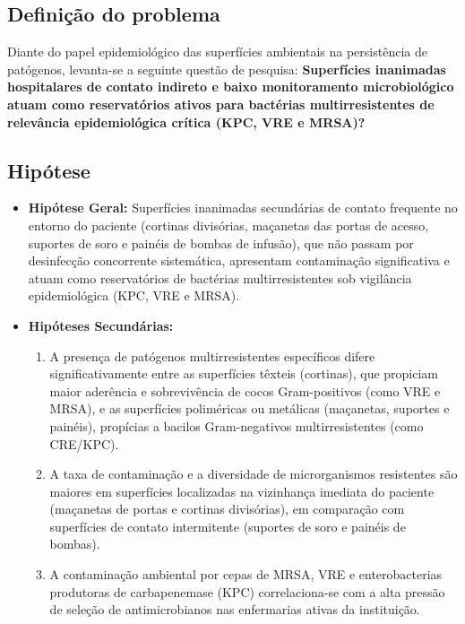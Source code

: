 \documentclass[12pt,a4paper]{article}
\begin{document}
\subsection{Definição do problema}
Diante do papel epidemiológico das superfícies ambientais na persistência de patógenos, levanta-se a seguinte questão de pesquisa:
\textbf{Superfícies inanimadas hospitalares de contato indireto e baixo monitoramento microbiológico atuam como reservatórios ativos para bactérias multirresistentes de relevância epidemiológica crítica (KPC, VRE e MRSA)?}

\subsection{Hipótese}
\begin{itemize}
    \item \textbf{Hipótese Geral:} Superfícies inanimadas secundárias de contato frequente no entorno do paciente (cortinas divisórias, maçanetas das portas de acesso, suportes de soro e painéis de bombas de infusão), que não passam por desinfecção concorrente sistemática, apresentam contaminação significativa e atuam como reservatórios de bactérias multirresistentes sob vigilância epidemiológica (KPC, VRE e MRSA).
    \item \textbf{Hipóteses Secundárias:}
    \begin{enumerate}
        \item A presença de patógenos multirresistentes específicos difere significativamente entre as superfícies têxteis (cortinas), que propiciam maior aderência e sobrevivência de cocos Gram-positivos (como VRE e MRSA), e as superfícies poliméricas ou metálicas (maçanetas, suportes e painéis), propícias a bacilos Gram-negativos multirresistentes (como CRE/KPC).
        \item A taxa de contaminação e a diversidade de microrganismos resistentes são maiores em superfícies localizadas na vizinhança imediata do paciente (maçanetas de portas e cortinas divisórias), em comparação com superfícies de contato intermitente (suportes de soro e painéis de bombas).
        \item A contaminação ambiental por cepas de MRSA, VRE e enterobacterias produtoras de carbapenemase (KPC) correlaciona-se com a alta pressão de seleção de antimicrobianos nas enfermarias ativas da instituição.
    \end{enumerate}
\end{itemize}
\newpage

\end{document}
